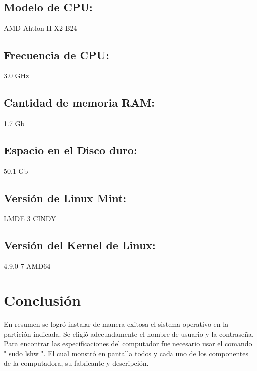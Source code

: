 \documentclass[
  letterpaper, 
  maincolor=black,
  sectioncolor=black!90,
  subsectioncolor=black!70,
  itemtextcolor=black!40,
]{fortysecondscv}
\begin{document}
        \subsection{Modelo de CPU:}
            AMD Ahtlon II X2 B24
        \subsection{Frecuencia de CPU:}
            3.0 GHz
        \subsection{Cantidad de memoria RAM:}
            1.7 Gb
        \subsection{Espacio en el Disco duro:}
            50.1 Gb
        \subsection{Versión de Linux Mint:}
            LMDE 3 CINDY
        \subsection{Versión del Kernel de Linux:}
            4.9.0-7-AMD64
        
\section{Conclusión}
    En resumen se logró instalar de manera exitosa el sistema operativo en la partición indicada. Se eligió adecuadamente el nombre de usuario y la contraseña. Para encontrar las especificaciones del computador fue necesario usar el comando " sudo lshw ". El cual monstró en pantalla todos y cada uno de los componentes de la computadora, su fabricante y descripción. 
    
    
\end{document}
